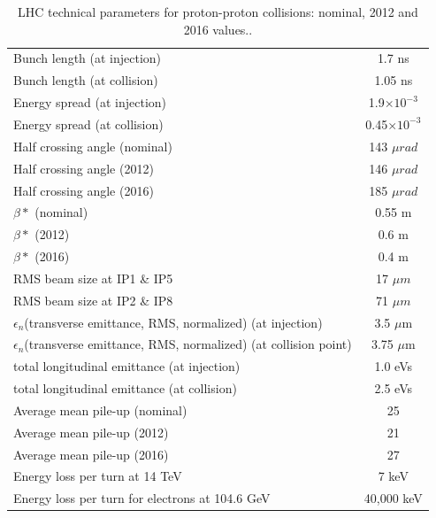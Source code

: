 \begin{table}
\begin{tabular}[!htbp]{l c}
\hline
Bunch length (at injection)   &   1.7 ns \\
Bunch length (at collision)   &   1.05 ns \\
Energy spread (at injection)   &   1.9$\times 10^{-3}$ \\
Energy spread (at collision)   &   0.45$\times 10^{-3}$  \\
\hline
Half crossing angle  (nominal)   & 143 $\mu rad$ \\
Half crossing angle  (2012)   & 146 $\mu rad$ \\
Half crossing angle  (2016)   & 185 $\mu rad$ \\
\hline
$\beta *$  (nominal) &   0.55 m\\
$\beta *$   (2012)&   0.6 m\\
$\beta *$   (2016)&   0.4 m\\
\hline
RMS beam size at IP1 \& IP5 &   17 $\mu m$ \\
RMS beam size at IP2 \& IP8 &   71 $\mu m$ \\
\hline
$\epsilon_n$(transverse emittance, RMS, normalized) (at injection) &   3.5 $\mu$m\\
$\epsilon_n$(transverse emittance, RMS, normalized) (at collision point) &   3.75 $\mu$m\\
\hline
total longitudinal emittance (at injection) & 1.0 eVs \\
total longitudinal emittance (at collision) & 2.5 eVs \\
\hline
Average mean pile-up (nominal) &   25 \\
Average mean pile-up (2012) &    21 \\
Average mean pile-up (2016) &    27 \\
\hline
Energy loss per turn at 14 TeV              &   7 keV   \\
Energy loss per turn for electrons at 104.6 GeV          &  40,000 keV     \\
\end{tabular}
\caption{LHC technical parameters for proton-proton collisions: nominal, 2012 and 2016 values.\cite{Bruce2016, Schoerner-Sadenius2015, LHC-parameters-2016, LHC-tdr-vol1, cms-lumi-public-results}.}
\label{table:LHC-parameters}
\end{table}

